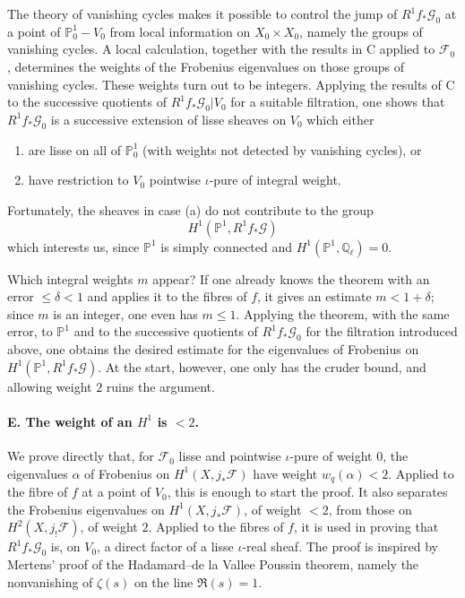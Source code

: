 \documentclass[11pt]{article}
\theoremstyle{remark}
\newcommand{\Ql}{\mathbb{Q}_\ell}
\begin{document}
The theory of vanishing cycles makes it possible to control the jump of $R^1f_{*}\mathcal G_0$ at a point of $\mathbb P^1_0-V_0$ from local information on $X_0\times X_0$, namely the groups of vanishing cycles. A local calculation, together with the results in C applied to $\mathcal F_0$, determines the weights of the Frobenius eigenvalues on those groups of vanishing cycles. These weights turn out to be integers. Applying the results of C to the successive quotients of $R^1f_{*}\mathcal G_0|V_0$ for a suitable filtration, one shows that $R^1f_{*}\mathcal G_0$ is a successive extension of lisse sheaves on $V_0$ which either
\begin{enumerate}[label=(\alph*)]
\item are lisse on all of $\mathbb P^1_0$ (with weights not detected by vanishing cycles), or
\item have restriction to $V_0$ pointwise $\iota$-pure of integral weight.
\end{enumerate}
Fortunately, the sheaves in case (a) do not contribute to the group
\[
H^1(\mathbb P^1,R^1f_{*}\mathcal G)
\]
which interests us, since $\mathbb P^1$ is simply connected and $H^1(\mathbb P^1,\Ql)=0$.

Which integral weights $m$ appear? If one already knows the theorem with an error $\le \delta<1$ and applies it to the fibres of $f$, it gives an estimate $m<1+\delta$; since $m$ is an integer, one even has $m\le 1$. Applying the theorem, with the same error, to $\mathbb P^1$ and to the successive quotients of $R^1f_{*}\mathcal G_0$ for the filtration introduced above, one obtains the desired estimate for the eigenvalues of Frobenius on $H^1(\mathbb P^1,R^1f_{*}\mathcal G)$. At the start, however, one only has the cruder bound, and allowing weight $2$ ruins the argument.

\paragraph{E. The weight of an $H^1$ is $<2$.}
We prove directly that, for $\mathcal F_0$ lisse and pointwise $\iota$-pure of weight $0$, the eigenvalues $\alpha$ of Frobenius on $H^1(X,j_{*}\mathcal F)$ have weight $w_q(\alpha)<2$. Applied to the fibre of $f$ at a point of $V_0$, this is enough to start the proof. It also separates the Frobenius eigenvalues on $H^1(X,j_{*}\mathcal F)$, of weight $<2$, from those on $H^2(X,j_{!}\mathcal F)$, of weight $2$. Applied to the fibres of $f$, it is used in proving that $R^1f_{*}\mathcal G_0$ is, on $V_0$, a direct factor of a lisse $\iota$-real sheaf. The proof is inspired by Mertens' proof of the Hadamard--de la Vallee Poussin theorem, namely the nonvanishing of $\zeta(s)$ on the line $\Re(s)=1$.
\end{document}
